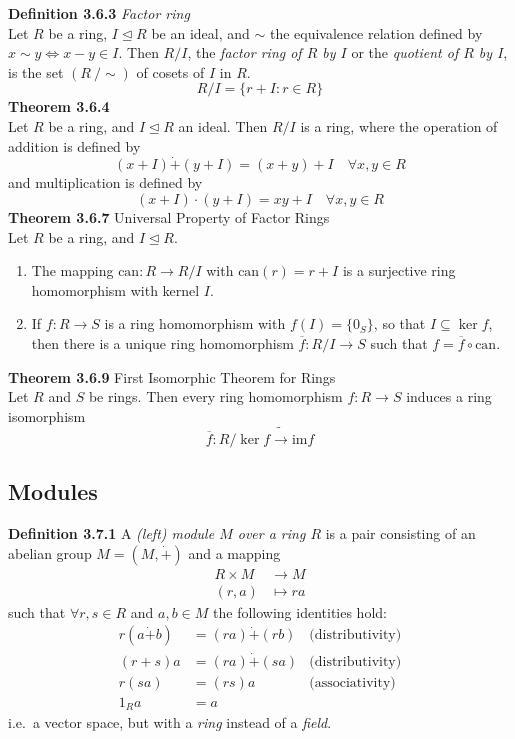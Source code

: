 \documentclass[8pt,landscape]{article}
\begin{document}
\begin{multicols}{3}
    \textbf{Definition 3.6.3} \emph{Factor ring} \\
    Let $R$ be a ring, $I \trianglelefteq R$ be an ideal, and $\sim$ the equivalence
    relation defined by $x \sim y \iff x-y \in I$.
    Then $R/I$, the \emph{factor ring of $R$ by $I$} or the
    \emph{quotient of $R$ by $I$}, is the set $(R \ / \sim)$ of cosets of $I$ in $R$.
    \[
        R/I = \{r + I : r \in R \}
    \]
    \textbf{Theorem 3.6.4} \\
    Let $R$ be a ring, and $I \trianglelefteq R$ an ideal.
    Then $R/I$ is a ring, where the operation of addition is defined by
    \[
        (x+I) \dot{+} (y+I) = (x+y) + I \quad \forall x,y \in R
    \]
    and multiplication is defined by
    \[
        (x+I) \cdot (y+I) = x y + I \quad \forall x,y \in R
    \]
    \textbf{Theorem 3.6.7} Universal Property of Factor Rings \\
    Let $R$ be a ring, and $I \trianglelefteq R$.
    \begin{enumerate}
        \item The mapping $\mathrm{can}: R \to R / I$ with $\mathrm{can}(r) = r + I$
            is a surjective ring homomorphism with kernel $I$.
        \item If $f : R \to S$ is a ring homomorphism with $f(I) = \{0_S\}$,
            so that $I \subseteq \ker f$, then there is a unique ring homomorphism
            $\overline{f}: R / I \to S$ such that $f = \overline{f} \circ \mathrm{can}$.
    \end{enumerate}

    \textbf{Theorem 3.6.9} First Isomorphic Theorem for Rings \\
    Let $R$ and $S$ be rings.
    Then every ring homomorphism $f: R \to S$ induces a ring isomorphism
    \[
        \overline{f} : R / \ker f \tilde{\to} \mathrm{im} f
    \]
    \subsection{Modules}
    \textbf{Definition 3.7.1}
    A \emph{(left) module $M$ over a ring $R$} is a pair consisting of an abelian group
    $M = (M, \dot{+})$ and a mapping
    \begin{align*}{}
        R \times M & \to M \\
        (r,a)      & \mapsto ra
    \end{align*}
    such that $\forall r,s \in R$ and $a,b \in M$ the following identities hold:
    \begin{align*}{}
        r(a \dot{+} b) & = (ra) \dot{+} (rb) & \text{(distributivity)} \\
        (r+s)a         & = (ra) \dot{+} (sa) & \text{(distributivity)}\\
        r(sa)          & = (rs)a             & \text{(associativity)}\\
        {1_R}a         & = a
    \end{align*}
    i.e.\ a vector space, but with a \emph{ring} instead of a \emph{field}.


\end{multicols}
\end{document}
